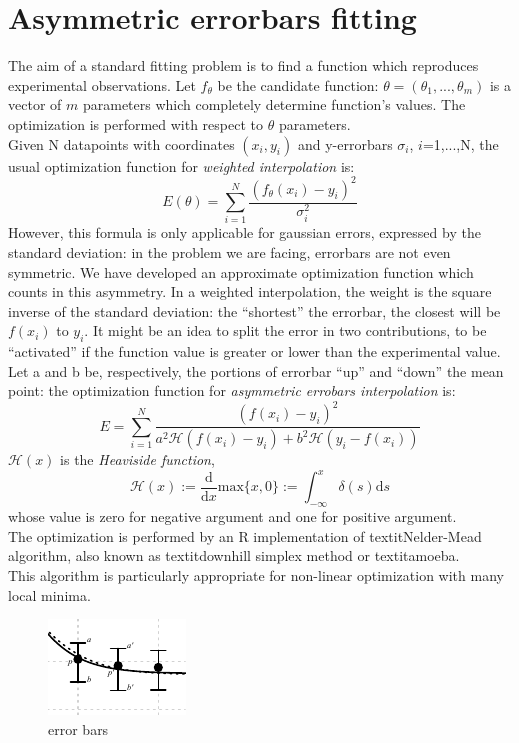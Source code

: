 \section{Asymmetric errorbars fitting}\label{Appendix B}
The aim of a standard fitting problem is to find a function which
reproduces experimental observations.
Let $f_{\theta}$ be the candidate function:
$\theta=(\theta_1,...,\theta_m)$ is a vector of $m$ parameters which
completely determine function's values.
The optimization is performed with respect to $\theta$ parameters.\\
Given N datapoints with coordinates ${(x_i,y_i)}$ and y-errorbars
$\sigma_i$, $i$=1,...,N, the usual optimization function for
\textit{weighted interpolation}\cite{interpolation} is:
$$
E(\theta)= \sum_{i=1}^{N} \frac{(f_{\theta}(x_i)-y_i)^2}{\sigma_{i}^2}
$$
However, this formula is only applicable for gaussian errors,
expressed by the standard deviation: in the problem we are facing,
errorbars are not even symmetric.
We have developed an approximate optimization function which counts
in this asymmetry.
In a weighted interpolation, the weight is the square inverse of the
standard deviation: the ``shortest'' the errorbar, the closest will
be $f(x_i)$ to $y_i$.
It might be an idea to split the error in two contributions,
to be ``activated'' if the function value is greater or lower
than the experimental value.
Let a and b be, respectively, the portions of errorbar ``up'' and ``down''
the mean point: the optimization function for \textit{asymmetric
  errobars interpolation} is:
$$ E= \sum_{i=1}^{N} \frac{(f(x_i)-y_i)^2}{a^{2}\mathcal{H}(f(x_i)-y_i)+b^{2}\mathcal{H}(y_i-f(x_i))} $$
$\mathcal{H}(x)$ is the \textit{Heaviside function},
$$\mathcal{H}(x):=\frac{\mathrm{d}}{\mathrm{d}x}\mathrm{max}
\{x,0\}:=\int_{-\infty}^x \delta (s) \mathrm{d}s$$ whose value
is zero for negative argument and one for positive argument.\\
The optimization is performed by an R implementation\cite{Roptim}
of textit{Nelder-Mead algorithm},\cite{neldermeadoriginal}
also known as textit{downhill simplex method} or
textit{amoeba}.\cite{neldermeadnumrec}\\
This algorithm is particularly appropriate for non-linear
optimization with many local minima.
\begin{figure}[htpb]
  \centering
  \includegraphics[width=.4\columnwidth]{img/err.pdf}
  \caption{error bars}
  \label{fig:errors}
\end{figure}
